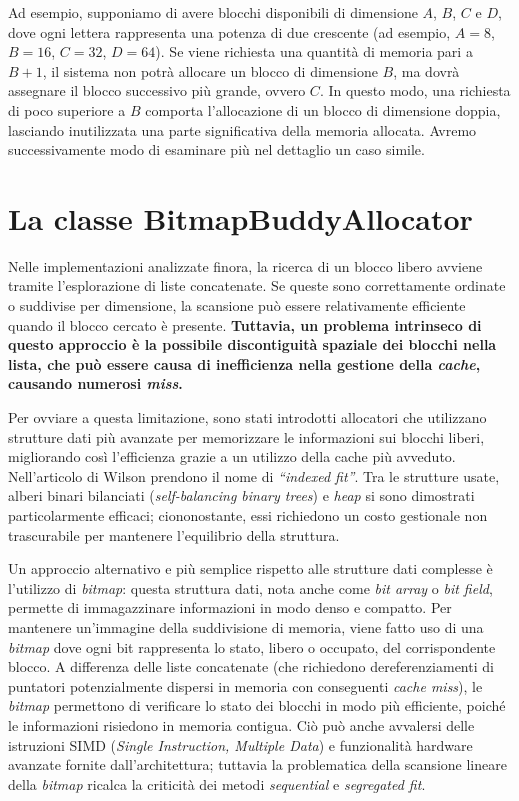 Ad esempio, supponiamo di avere blocchi disponibili di dimensione $A$, $B$, $C$ e $D$, dove ogni lettera rappresenta una potenza di due crescente (ad esempio, $A = 8$, $B = 16$, $C = 32$, $D = 64$). Se viene richiesta una quantità di memoria pari a $B+1$, il sistema non potrà allocare un blocco di dimensione $B$, ma dovrà assegnare il blocco successivo più grande, ovvero $C$. In questo modo, una richiesta di poco superiore a $B$ comporta l'allocazione di un blocco di dimensione doppia, lasciando inutilizzata una parte significativa della memoria allocata. Avremo successivamente modo di esaminare più nel dettaglio un caso simile.

\section{La classe BitmapBuddyAllocator}
Nelle implementazioni analizzate finora, la ricerca di un blocco libero avviene tramite l'esplorazione di liste concatenate. Se queste sono correttamente ordinate o suddivise per dimensione, la scansione può essere relativamente efficiente quando il blocco cercato è presente. \textbf{Tuttavia, un problema intrinseco di questo approccio è la possibile discontiguità spaziale dei blocchi nella lista, che può essere causa di inefficienza nella gestione della \textit{cache}, causando numerosi \textit{miss}.}

Per ovviare a questa limitazione, sono stati introdotti allocatori che utilizzano strutture dati più avanzate per memorizzare le informazioni sui blocchi liberi, migliorando così l’efficienza grazie a un utilizzo della cache più avveduto. Nell’articolo di Wilson prendono il nome di \textit{“indexed fit”}. Tra le strutture usate, alberi binari bilanciati (\textit{self-balancing binary trees}) e \textit{heap} si sono dimostrati particolarmente efficaci; ciononostante, essi richiedono un costo gestionale non trascurabile per mantenere l’equilibrio della struttura.

Un approccio alternativo e più semplice rispetto alle strutture dati complesse è l’utilizzo di \textit{bitmap}: questa struttura dati, nota anche come \textit{bit array} o \textit{bit field}, permette di immagazzinare informazioni in modo denso e compatto.  Per mantenere un'immagine della suddivisione di memoria, viene fatto uso di una \textit{bitmap} dove ogni bit rappresenta lo stato, libero o occupato, del corrispondente blocco. A differenza delle liste concatenate (che richiedono dereferenziamenti di puntatori potenzialmente dispersi in memoria con conseguenti \textit{cache miss}), le \textit{bitmap} permettono di verificare lo stato dei blocchi in modo più efficiente, poiché le informazioni risiedono in memoria contigua. Ciò può anche avvalersi delle istruzioni SIMD (\textit{Single Instruction, Multiple Data}) e funzionalità hardware avanzate fornite dall’architettura; tuttavia la problematica della scansione lineare della \textit{bitmap} ricalca la criticità dei metodi \textit{sequential} e \textit{segregated fit}.

